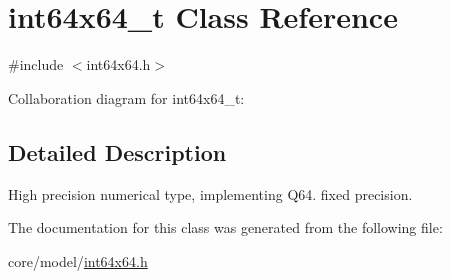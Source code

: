 \hypertarget{classint64x64__t}{}\section{int64x64\+\_\+t Class Reference}
\label{classint64x64__t}


{\ttfamily \#include $<$int64x64.\+h$>$}



Collaboration diagram for int64x64\+\_\+t\+:


\subsection{Detailed Description}
High precision numerical type, implementing Q64. fixed precision. 

The documentation for this class was generated from the following file\+:\begin{DoxyCompactItemize}
\item 
core/model/\hyperlink{int64x64_8h}{int64x64.\+h}\end{DoxyCompactItemize}
